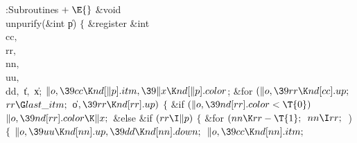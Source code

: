 \Y\B\4:Subroutines\X${}\mathrel+\E{}$\6
\1\1\&{void} \\{unpurify}(\&{int} \|p)\2\2\6
${}\{{}$\1\6
\&{register} \&{int} \\{cc}${},{}$ \\{rr}${},{}$ \\{nn}${},{}$ \\{uu}${},{}$ %
\\{dd}${},{}$ \|t${},{}$ \|x;\7
${}\|o,\39\\{cc}\K\\{nd}[\|p].\\{itm},\39\|x\K\\{nd}[\|p].\\{color}{}$;\6
\&{for} ${}(\|o,\39\\{rr}\K\\{nd}[\\{cc}].\\{up};{}$ ${}\\{rr}\G\\{last%
\_itm};{}$ \|o${},\39\\{rr}\K\\{nd}[\\{rr}].\\{up}){}$\5
${}\{{}$\1\6
\&{if} ${}(\|o,\39\\{nd}[\\{rr}].\\{color}<\T{0}){}$\1\5
${}\|o,\39\\{nd}[\\{rr}].\\{color}\K\|x;{}$\2\6
\&{else} \&{if} ${}(\\{rr}\I\|p){}$\5
${}\{{}$\1\6
\&{for} ${}(\\{nn}\K\\{rr}-\T{1};{}$ ${}\\{nn}\I\\{rr};{}$ \,)\5
${}\{{}$\1\6
${}\|o,\39\\{uu}\K\\{nd}[\\{nn}].\\{up},\39\\{dd}\K\\{nd}[\\{nn}].\\{down};{}$\6
${}\|o,\39\\{cc}\K\\{nd}[\\{nn}].\\{itm};{}$\6
